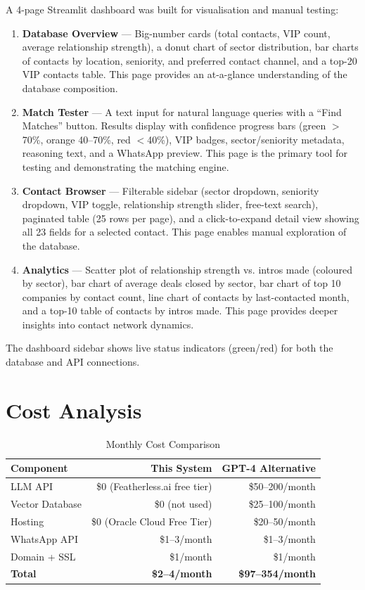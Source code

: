 \documentclass[12pt, a4paper]{report}
\begin{document}
A 4-page Streamlit dashboard was built for visualisation and manual testing:

\begin{enumerate}[itemsep=4pt]
    \item \textbf{Database Overview} --- Big-number cards (total contacts, VIP count, average relationship strength), a donut chart of sector distribution, bar charts of contacts by location, seniority, and preferred contact channel, and a top-20 VIP contacts table. This page provides an at-a-glance understanding of the database composition.
    \item \textbf{Match Tester} --- A text input for natural language queries with a ``Find Matches'' button. Results display with confidence progress bars (green $>$70\%, orange 40--70\%, red $<$40\%), VIP badges, sector/seniority metadata, reasoning text, and a WhatsApp preview. This page is the primary tool for testing and demonstrating the matching engine.
    \item \textbf{Contact Browser} --- Filterable sidebar (sector dropdown, seniority dropdown, VIP toggle, relationship strength slider, free-text search), paginated table (25 rows per page), and a click-to-expand detail view showing all 23 fields for a selected contact. This page enables manual exploration of the database.
    \item \textbf{Analytics} --- Scatter plot of relationship strength vs. intros made (coloured by sector), bar chart of average deals closed by sector, bar chart of top 10 companies by contact count, line chart of contacts by last-contacted month, and a top-10 table of contacts by intros made. This page provides deeper insights into contact network dynamics.
\end{enumerate}

The dashboard sidebar shows live status indicators (green/red) for both the database and API connections.

\chapter{Cost Analysis}

\begin{table}[H]
\centering
\begin{tabular}{lrr}
\toprule
\textbf{Component} & \textbf{This System} & \textbf{GPT-4 Alternative} \\
\midrule
LLM API & \$0 (Featherless.ai free tier) & \$50--200/month \\
Vector Database & \$0 (not used) & \$25--100/month \\
Hosting & \$0 (Oracle Cloud Free Tier) & \$20--50/month \\
WhatsApp API & \$1--3/month & \$1--3/month \\
Domain + SSL & \$1/month & \$1/month \\
\midrule
\textbf{Total} & \textbf{\$2--4/month} & \textbf{\$97--354/month} \\
\bottomrule
\end{tabular}
\caption{Monthly Cost Comparison}
\end{table}
\end{document}
